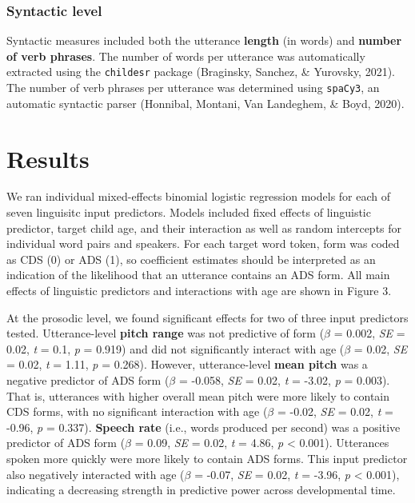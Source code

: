 \documentclass[10pt, letterpaper]{article}
\begin{document}
\hypertarget{syntactic-level}{%
\subsubsection{Syntactic level}\label{syntactic-level}}

Syntactic measures included both the utterance \textbf{length} (in
words) and \textbf{number of verb phrases}. The number of words per
utterance was automatically extracted using the \texttt{childesr}
package (Braginsky, Sanchez, \& Yurovsky, 2021). The number of verb
phrases per utterance was determined using \texttt{spaCy3}, an automatic
syntactic parser (Honnibal, Montani, Van Landeghem, \& Boyd, 2020).

\hypertarget{results-1}{%
\section{Results}\label{results-1}}

We ran individual mixed-effects binomial logistic regression models for
each of seven linguisitc input predictors. Models included fixed effects
of linguistic predictor, target child age, and their interaction as well
as random intercepts for individual word pairs and speakers. For each
target word token, form was coded as CDS (0) or ADS (1), so coefficient
estimates should be interpreted as an indication of the likelihood that
an utterance contains an ADS form. All main effects of linguistic
predictors and interactions with age are shown in Figure 3.

At the prosodic level, we found significant effects for two of three
input predictors tested. Utterance-level \textbf{pitch range} was not
predictive of form (\(\beta\) = 0.002, \emph{SE} = 0.02, \emph{t} = 0.1,
\emph{p} = 0.919) and did not significantly interact with age (\(\beta\)
= 0.02, \emph{SE} = 0.02, \emph{t} = 1.11, \emph{p} = 0.268). However,
utterance-level \textbf{mean pitch} was a negative predictor of ADS form
(\(\beta\) = -0.058, \emph{SE} = 0.02, \emph{t} = -3.02, \emph{p} =
0.003). That is, utterances with higher overall mean pitch were more
likely to contain CDS forms, with no significant interaction with age
(\(\beta\) = -0.02, \emph{SE} = 0.02, \emph{t} = -0.96, \emph{p} =
0.337). \textbf{Speech rate} (i.e., words produced per second) was a
positive predictor of ADS form (\(\beta\) = 0.09, \emph{SE} = 0.02,
\emph{t} = 4.86, \emph{p} \textless{} 0.001). Utterances spoken more
quickly were more likely to contain ADS forms. This input predictor also
negatively interacted with age (\(\beta\) = -0.07, \emph{SE} = 0.02,
\emph{t} = -3.96, \emph{p} \textless{} 0.001), indicating a decreasing
strength in predictive power across developmental time.
\end{document}
